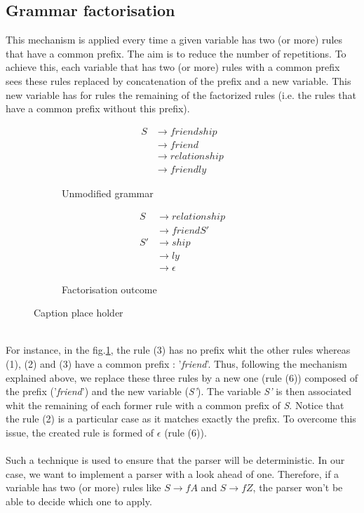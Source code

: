 \documentclass[a4paper,11pt]{article}
\begin{document}
  \subsection{Grammar factorisation}
    \label{sec:factorisation}
    This mechanism is applied every time a given variable has two (or more) rules that have a common prefix. The aim is to reduce the number of repetitions. To achieve this, each variable that has two (or more) rules with a common prefix sees these rules replaced by concatenation of the prefix and a new variable. This new variable has for rules the remaining of the factorized rules (i.e. the rules that have a common prefix without this prefix).
    \begin{figure}[h!]
        \centering
        \begin{subfigure}[b]{0.4\textwidth}
            \centering
            \begin{align}
              S &\rightarrow friendship \\
                &\rightarrow friend \\
                &\rightarrow relationship \\
                &\rightarrow friendly
            \end{align}
            \caption{Unmodified grammar}
            \label{fig:unmodifiedgrammar1}
        \end{subfigure}%
        \begin{subfigure}[b]{0.4\textwidth}
            \centering
            \begin{align}
              S  &\rightarrow relationship \\
                 &\rightarrow friendS' \\
              S' &\rightarrow ship \\
                 &\rightarrow ly \\
                 &\rightarrow \epsilon
            \end{align}
            \caption{Factorisation outcome}
            \label{fig:resultinggrammar1}
        \end{subfigure}
        \caption{Caption place holder}
    \end{figure}\\
    For instance, in the fig.\ref{fig:unmodifiedgrammar1}, the rule (3) has no prefix whit the other rules whereas (1), (2) and (3) have a common prefix : '\textit{friend}'. Thus, following the mechanism explained above, we replace these three rules by a new one (rule (6)) composed of the prefix ('\textit{friend}') and the new variable (\textit{S'}). The variable \textit{S'} is then associated whit the remaining of each former rule with a common prefix of \textit{S}. Notice that the rule (2) is a particular case as it matches exactly the prefix. To overcome this issue, the created rule is formed of $\epsilon$ (rule (6)).\\\\
    Such a technique is used to ensure that the parser will be deterministic. In our case, we want to implement a parser with a look ahead of one. Therefore, if a variable has two (or more) rules like $S \rightarrow fA$ and $S \rightarrow fZ$, the parser won't be able to decide which one to apply.
  
\end{document}
